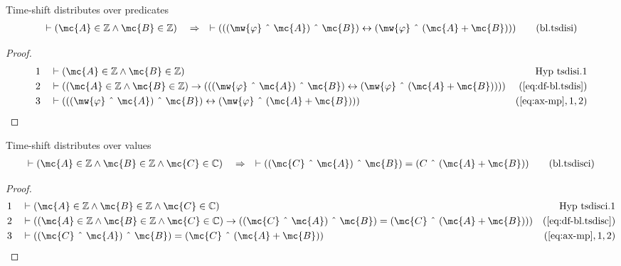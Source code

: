 \begin{lemma} {Time-shift distributes over predicates}
\begin{align}
\vdash ( \mc{A} \in \mathbb{Z} \wedge \mc{B} \in \mathbb{Z} )\quad\Rightarrow\quad \vdash
    ( ( ( \mw{\varphi} ~\string^~ \mc{A} ) ~\string^~ \mc{B} ) \leftrightarrow (
    \mw{\varphi} ~\string^~ ( \mc{A} + \mc{B} ) ) )\label{eq:bl.tsdisi}\tag{bl.tsdisi}
\end{align}
\end{lemma}


\begin{proof}
\begin{align}
  1 &&  & \vdash ( \mc{A} \in \mathbb{Z} \wedge \mc{B} \in \mathbb{Z}
     )&\text{Hyp~tsdisi.1}\notag%
  \\ 2 &&  & \vdash ( ( \mc{A} \in \mathbb{Z} \wedge \mc{B} \in \mathbb{Z} ) \rightarrow
     ( ( ( \mw{\varphi} ~\string^~ \mc{A} ) ~\string^~ \mc{B} )
     \leftrightarrow ( \mw{\varphi} ~\string^~ ( \mc{A} + \mc{B} ) )
     ) )&(\mbox{\ref{eq:df-bl.tsdis}})\notag
  \\ 3 &&  & \vdash ( ( ( \mw{\varphi} ~\string^~ \mc{A} ) ~\string^~ \mc{B} )
     \leftrightarrow ( \mw{\varphi} ~\string^~ ( \mc{A} + \mc{B} ) )
     )&(\mbox{\ref{eq:ax-mp}},1,2)\notag
\end{align}
\end{proof}

\begin{lemma} {Time-shift distributes over values}
\begin{align}
\vdash ( \mc{A} \in \mathbb{Z} \wedge \mc{B} \in \mathbb{Z} \wedge \mc{C} \in \mathbb{C}
    )\quad\Rightarrow\quad \vdash ( ( \mc{C} ~\string^~ \mc{A} ) ~\string^~ \mc{B} ) = ( C
    ~\string^~ ( \mc{A} + \mc{B} ) )\label{eq:bl.tsdisci}\tag{bl.tsdisci}
\end{align}
\end{lemma}


\begin{proof}
\begin{align}
  1 &&  & \vdash ( \mc{A} \in \mathbb{Z} \wedge \mc{B} \in \mathbb{Z} \wedge \mc{C} \in
     \mathbb{C} )&\text{Hyp~tsdisci.1}\notag%
  \\ 2 &&  & \vdash ( ( \mc{A} \in \mathbb{Z} \wedge \mc{B} \in \mathbb{Z} \wedge \mc{C} \in
     \mathbb{C} ) \rightarrow ( ( \mc{C} ~\string^~ \mc{A} )
     ~\string^~ \mc{B} ) = ( \mc{C} ~\string^~ ( \mc{A} + \mc{B} ) )
     )&(\mbox{\ref{eq:df-bl.tsdisc}})\notag
  \\ 3 &&  & \vdash ( ( \mc{C} ~\string^~ \mc{A} ) ~\string^~ \mc{B} ) = ( \mc{C} ~\string^~ ( \mc{A} +
     \mc{B} ) )&(\mbox{\ref{eq:ax-mp}},1,2)\notag
\end{align}
\end{proof}

